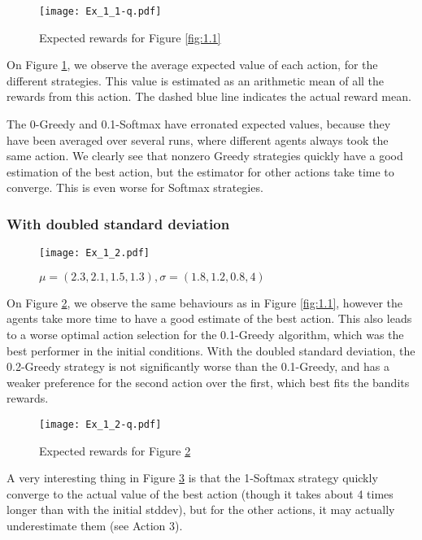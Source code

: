 \documentclass[a4paper,11pt]{article}
\begin{document}
\begin{figure}[H]
  \center
  \texttt{[image: Ex\_1\_1-q.pdf]}
  \caption{\label{fig:1.1q} Expected rewards for Figure \ref{fig:1.1}}
\end{figure}

On Figure \ref{fig:1.1q}, we observe the average expected value of each action, for the different strategies. This value is estimated as an arithmetic mean of all the rewards from this action. The dashed blue line indicates the actual reward mean.

The 0-Greedy and 0.1-Softmax have erronated expected values, because they have been averaged over several runs, where different agents always took the same action. We clearly see that nonzero Greedy strategies quickly have a good estimation of the best action, but the estimator for other actions take time to converge. This is even worse for Softmax strategies.

\subsubsection{With doubled standard deviation}
\begin{figure}[H]
  \center
  \texttt{[image: Ex\_1\_2.pdf]}
  \caption{\label{fig:1.2} $\mu = (2.3, 2.1, 1.5, 1.3), \sigma = (1.8, 1.2, 0.8, 4)$}
\end{figure}

On Figure \ref{fig:1.2}, we observe the same behaviours as in Figure \ref{fig:1.1}, however the agents take more time to have a good estimate of the best action. This also leads to a worse optimal action selection for the 0.1-Greedy algorithm, which was the best performer in the initial conditions. With the doubled standard deviation, the 0.2-Greedy strategy is not significantly worse than the 0.1-Greedy, and has a weaker preference for the second action over the first, which best fits the bandits rewards.

\begin{figure}[H]
  \center
  \texttt{[image: Ex\_1\_2-q.pdf]}
  \caption{\label{fig:1.2q} Expected rewards for Figure \ref{fig:1.2}}
\end{figure}

A very interesting thing in Figure \ref{fig:1.2q} is that the 1-Softmax strategy quickly converge to the actual value of the best action (though it takes about 4 times longer than with the initial stddev), but for the other actions, it may actually underestimate them (see Action 3).
\end{document}
